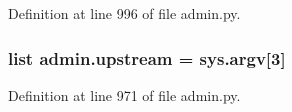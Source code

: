 Definition at line 996 of file admin.\-py.

\hypertarget{namespaceadmin_ae04b67153bc11f5b3a23e4fd760832fb}{
\subsubsection[{upstream}]{\setlength{\rightskip}{0pt plus 5cm}list admin.\-upstream = sys.\-argv\mbox{[}3\mbox{]}}}\label{namespaceadmin_ae04b67153bc11f5b3a23e4fd760832fb}


Definition at line 971 of file admin.\-py.

